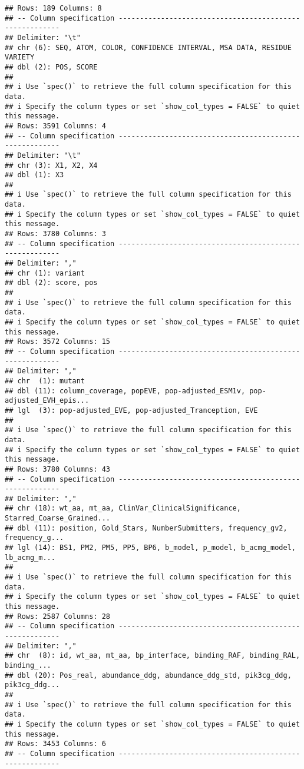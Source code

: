 \documentclass[
]{article}
\begin{document}
\begin{verbatim}
## Rows: 189 Columns: 8
## -- Column specification --------------------------------------------------------
## Delimiter: "\t"
## chr (6): SEQ, ATOM, COLOR, CONFIDENCE INTERVAL, MSA DATA, RESIDUE VARIETY
## dbl (2): POS, SCORE
## 
## i Use `spec()` to retrieve the full column specification for this data.
## i Specify the column types or set `show_col_types = FALSE` to quiet this message.
## Rows: 3591 Columns: 4
## -- Column specification --------------------------------------------------------
## Delimiter: "\t"
## chr (3): X1, X2, X4
## dbl (1): X3
## 
## i Use `spec()` to retrieve the full column specification for this data.
## i Specify the column types or set `show_col_types = FALSE` to quiet this message.
## Rows: 3780 Columns: 3
## -- Column specification --------------------------------------------------------
## Delimiter: ","
## chr (1): variant
## dbl (2): score, pos
## 
## i Use `spec()` to retrieve the full column specification for this data.
## i Specify the column types or set `show_col_types = FALSE` to quiet this message.
## Rows: 3572 Columns: 15
## -- Column specification --------------------------------------------------------
## Delimiter: ","
## chr  (1): mutant
## dbl (11): column_coverage, popEVE, pop-adjusted_ESM1v, pop-adjusted_EVH_epis...
## lgl  (3): pop-adjusted_EVE, pop-adjusted_Tranception, EVE
## 
## i Use `spec()` to retrieve the full column specification for this data.
## i Specify the column types or set `show_col_types = FALSE` to quiet this message.
## Rows: 3780 Columns: 43
## -- Column specification --------------------------------------------------------
## Delimiter: ","
## chr (18): wt_aa, mt_aa, ClinVar_ClinicalSignificance, Starred_Coarse_Grained...
## dbl (11): position, Gold_Stars, NumberSubmitters, frequency_gv2, frequency_g...
## lgl (14): BS1, PM2, PM5, PP5, BP6, b_model, p_model, b_acmg_model, lb_acmg_m...
## 
## i Use `spec()` to retrieve the full column specification for this data.
## i Specify the column types or set `show_col_types = FALSE` to quiet this message.
## Rows: 2587 Columns: 28
## -- Column specification --------------------------------------------------------
## Delimiter: ","
## chr  (8): id, wt_aa, mt_aa, bp_interface, binding_RAF, binding_RAL, binding_...
## dbl (20): Pos_real, abundance_ddg, abundance_ddg_std, pik3cg_ddg, pik3cg_ddg...
## 
## i Use `spec()` to retrieve the full column specification for this data.
## i Specify the column types or set `show_col_types = FALSE` to quiet this message.
## Rows: 3453 Columns: 6
## -- Column specification --------------------------------------------------------

\end{verbatim}
\end{document}
